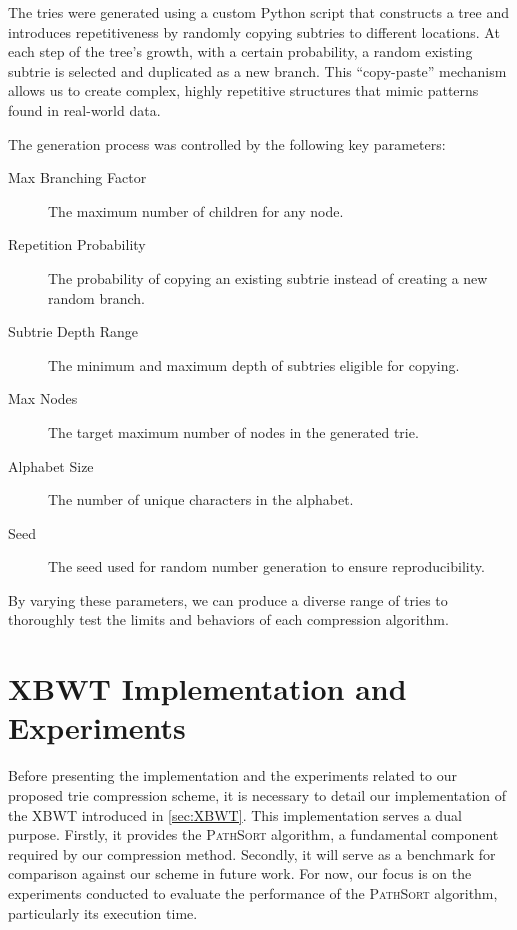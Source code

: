 The tries were generated using a custom Python script that constructs a tree and introduces repetitiveness by randomly copying subtries to different locations. At each step of the tree's growth, with a certain probability, a random existing subtrie is selected and duplicated as a new branch. This ``copy-paste'' mechanism allows us to create complex, highly repetitive structures that mimic patterns found in real-world data.

The generation process was controlled by the following key parameters:
\begin{description}
    \item[Max Branching Factor] The maximum number of children for any node.
    \item[Repetition Probability] The probability of copying an existing subtrie instead of creating a new random branch.
    \item[Subtrie Depth Range] The minimum and maximum depth of subtries eligible for copying.
    \item[Max Nodes] The target maximum number of nodes in the generated trie.
    \item[Alphabet Size] The number of unique characters in the alphabet.
    \item[Seed] The seed used for random number generation to ensure reproducibility.
\end{description}

By varying these parameters, we can produce a diverse range of tries to thoroughly test the limits and behaviors of each compression algorithm.

\section{XBWT Implementation and Experiments}
Before presenting the implementation and the experiments related to our proposed trie compression scheme, it is necessary to detail our implementation of the XBWT introduced in \cref{sec:XBWT}. This implementation serves a dual purpose. Firstly, it provides the \textsc{PathSort} algorithm, a fundamental component required by our compression method. Secondly, it will serve as a benchmark for comparison against our scheme in future work. For now, our focus is on the experiments conducted to evaluate the performance of the \textsc{PathSort} algorithm, particularly its execution time.




